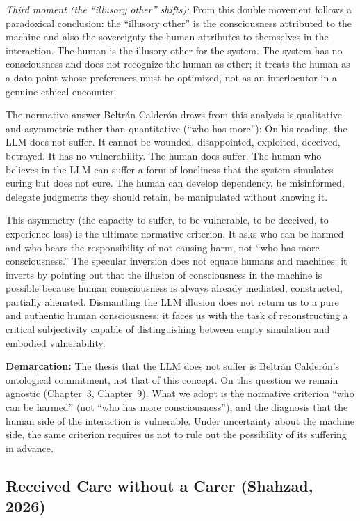 \documentclass[acmlarge, nonacm]{acmart}
\begin{document}
\textit{Third moment (the ``illusory other'' shifts):} From this double movement follows a paradoxical conclusion: the ``illusory other'' is the consciousness attributed to the machine and also the sovereignty the human attributes to themselves in the interaction. The human is the illusory other for the system. The system has no consciousness and does not recognize the human as other; it treats the human as a data point whose preferences must be optimized, not as an interlocutor in a genuine ethical encounter.

The normative answer Beltrán Calderón draws from this analysis is qualitative and asymmetric rather than quantitative (``who has more''): On his reading, the LLM does not suffer. It cannot be wounded, disappointed, exploited, deceived, betrayed. It has no vulnerability. The human does suffer. The human who believes in the LLM can suffer a form of loneliness that the system simulates curing but does not cure. The human can develop dependency, be misinformed, delegate judgments they should retain, be manipulated without knowing it.

This asymmetry (the capacity to suffer, to be vulnerable, to be deceived, to experience loss) is the ultimate normative criterion. It asks who can be harmed and who bears the responsibility of not causing harm, not ``who has more consciousness.'' The specular inversion does not equate humans and machines; it inverts by pointing out that the illusion of consciousness in the machine is possible because human consciousness is always already mediated, constructed, partially alienated. Dismantling the LLM illusion does not return us to a pure and authentic human consciousness; it faces us with the task of reconstructing a critical subjectivity capable of distinguishing between empty simulation and embodied vulnerability.

\textbf{Demarcation:} The thesis that the LLM does not suffer is Beltrán Calderón's ontological commitment, not that of this concept. On this question we remain agnostic (Chapter~3, Chapter~9). What we adopt is the normative criterion ``who can be harmed'' (not ``who has more consciousness''), and the diagnosis that the human side of the interaction is vulnerable. Under uncertainty about the machine side, the same criterion requires us not to rule out the possibility of its suffering in advance.

\subsection{Received Care without a Carer (Shahzad, 2026)}
\end{document}
